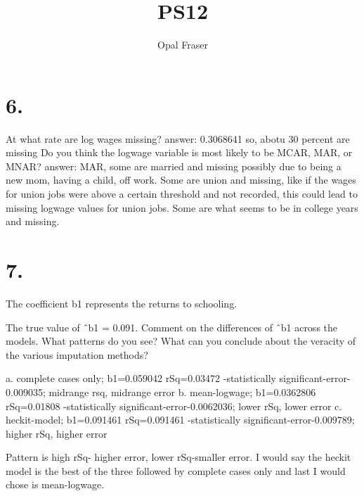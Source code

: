 \documentclass{article}
\title{PS12}
\author{Opal Fraser}
\begin{document}
\maketitle


\section{6.}





At what rate are log wages missing? 
answer: 0.3068641 so, abotu 30 percent are missing
Do you think the logwage variable is most likely
to be MCAR, MAR, or MNAR?
answer: MAR, some are married and missing possibly due to being a new mom, having a child, off work. Some are union and missing, like if the wages for union jobs were above a certain threshold and not recorded, this could lead to missing logwage values for union jobs. Some are what seems to be in college years and missing. 



\section{7.}

The coefficient b1 represents the returns to schooling. 

The true value of ˆb1 = 0.091. Comment on the differences of ˆb1 across the models.
What patterns do you see? What can you conclude about the veracity of the various imputation methods?

a. complete cases only; b1=0.059042 rSq=0.03472 -statistically significant-error-0.009035; midrange rsq, midrange error
b. mean-logwage; b1=0.0362806 rSq=0.01808 -statistically significant-error-0.0062036; lower rSq, lower error
c. heckit-model; b1=0.091461 rSq=0.091461 -statistically significant-error-0.009789; higher rSq, higher error

Pattern is high rSq- higher error, lower rSq-smaller error. I would say the heckit model is the best of the three followed by complete cases only and last I would chose is mean-logwage. 

\end{document}
